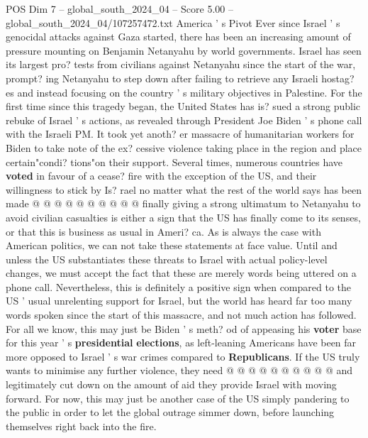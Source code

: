 \begin{textsample}{POS Dim 7 – global\_south\_2024\_04 – Score 5.00 – global\_south\_2024\_04/107257472.txt}  \label{ex:f7_pos_174}
America ' s Pivot Ever since Israel ' s genocidal attacks against Gaza started, there has been an increasing amount of pressure mounting on Benjamin Netanyahu by world governments.
Israel has seen its largest pro? tests from civilians against Netanyahu since the start of the war, prompt? ing Netanyahu to step down after failing to retrieve any Israeli hostag? es and instead focusing on the country ' s military objectives in Palestine.
For the first time since this tragedy began, the United States has is? sued a strong public rebuke of Israel ' s actions, as revealed through President Joe Biden ' s phone call with the Israeli PM.
It took yet anoth? er massacre of humanitarian workers for Biden to take note of the ex? cessive violence taking place in the region and place certain"condi? tions"on their support.
Several times, numerous countries have \textbf{voted} in favour of a cease? fire with the exception of the US, and their willingness to stick by Is? rael no matter what the rest of the world says has been made @ @ @ @ @ @ @ @ @ @ finally giving a strong ultimatum to Netanyahu to avoid civilian casualties is either a sign that the US has finally come to its senses, or that this is business as usual in Ameri? ca.
As is always the case with American politics, we can not take these statements at face value.
Until and unless the US substantiates these threats to Israel with actual policy-level changes, we must accept the fact that these are merely words being uttered on a phone call.
Nevertheless, this is definitely a positive sign when compared to the US ' usual unrelenting support for Israel, but the world has heard far too many words spoken since the start of this massacre, and not much action has followed.
For all we know, this may just be Biden ' s meth? od of appeasing his \textbf{voter} base for this year ' s \textbf{presidential} \textbf{elections}, as left-leaning Americans have been far more opposed to Israel ' s war crimes compared to \textbf{Republicans}.
If the US truly wants to minimise any further violence, they need @ @ @ @ @ @ @ @ @ @ and legitimately cut down on the amount of aid they provide Israel with moving forward.
For now, this may just be another case of the US simply pandering to the public in order to let the global outrage simmer down, before launching themselves right back into the fire.

\end{textsample}
